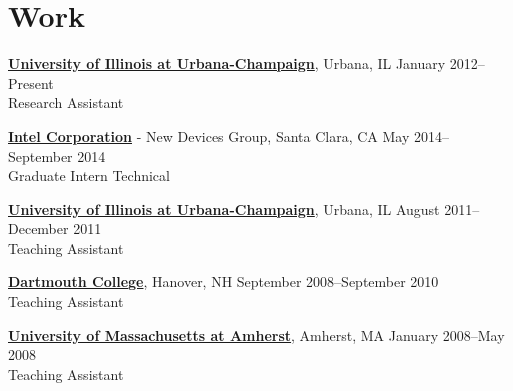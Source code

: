 \section{\sc Work}
{\href{http://www.illinois.edu/}{{\bf University of Illinois at Urbana-Champaign}}}, Urbana, IL \hfill January 2012--Present\\
Research Assistant

{\href{http://www.intel.com/}{{\bf Intel Corporation}}} - New Devices Group, Santa Clara, CA \hfill May 2014--September 2014\\
Graduate Intern Technical

{\href{http://www.illinois.edu/}{{\bf University of Illinois at Urbana-Champaign}}}, Urbana, IL \hfill August 2011--December 2011\\
Teaching Assistant

{\href{http://www.dartmouth.edu/}{{\bf Dartmouth College}}}, Hanover, NH \hfill September 2008--September 2010\\
Teaching Assistant

{\href{http://www.umass.edu/}{{\bf University of Massachusetts at Amherst}}}, Amherst, MA \hfill January 2008--May 2008\\
Teaching Assistant
